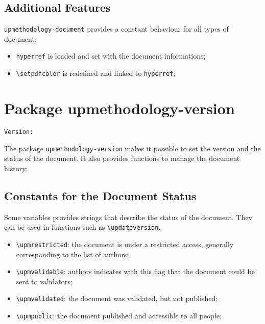 \documentclass[book,taskpackage,specpackage,codepackage]{upmethodology-document}
\makeatletter
\let\VERversion\upm@package@version@ver
\makeatother
\begin{document}
\section{Additional Features}

\texttt{upmethodology-document} provides a constant behaviour for all types of document:
\begin{itemize}
\item \texttt{hyperref} is loaded and set with the document informations;
\item \texttt{{\textbackslash}setpdfcolor} is redefined and linked to \texttt{hyperref};
\end{itemize}


\chapter{Package upmethodology-version}

\begin{center}
	\texttt{Version: \VERversion}
\end{center}

The package \texttt{upmethodology-version} makes it possible to set the version and the status of the document. It also provides functions to manage the document history;

\section{Constants for the Document Status}

Some \LaTeXe\xspace variables provides strings that describe the status of the document. They can be used in functions such as \texttt{{\textbackslash}updateversion}.
\begin{itemize}
\item \texttt{{\textbackslash}upmrestricted}: the document is under a restricted access, generally corresponding to the list of authors;
\item \texttt{{\textbackslash}upmvalidable}: authors indicates with this flag that the document could be sent to validators;
\item \texttt{{\textbackslash}upmvalidated}: the document was validated, but not published;
\item \texttt{{\textbackslash}upmpublic}: the document published and accessible to all people;
\end{itemize}
\end{document}
